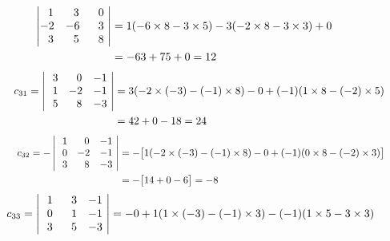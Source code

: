 \documentclass[12pt]{amsart}
\begin{document}
\begin{enumerate}
\begin{enumerate}
\begin{align}
\begin{vmatrix}
					\text{ } \text{ }1 &\text{ } \text{ }3 &\text{ } \text{ }0 \text{ } \\
					-2 &-6 &\text{ } \text{ }3 \text{ } \\
					\text{ } \text{ }3 &\text{ } \text{ }5 &\text{ } \text{ }8 \text{ } \\
				\end{vmatrix}&=1(-6\times8-3\times5)-3(-2\times8-3\times3)+0 \notag \\
				&=-63+75+0=12 \notag
			\end{align}
			\begin{align}
			\hspace{1cm} c_{31}=
				\begin{vmatrix}
					\text{ } \text{ }3 &\text{ } \text{ }0 &-1 \text{ } \\
					\text{ } \text{ }1 &-2 &-1 \text{ } \\
					\text{ } \text{ }5 &\text{ } \text{ }8 &-3 \text{ } \\
				\end{vmatrix}&=3(-2\times(-3)-(-1)\times8)-0+(-1)(1\times8-(-2)\times5) \notag \\
				&=42+0-18=24 \notag
			\end{align}
			\begin{align}
			\hspace{1.2cm} c_{32}=-
				\begin{vmatrix}
					\text{ } \text{ }1 &\text{ } \text{ }0 &-1 \text{ } \\
					\text{ } \text{ }0 &-2 &-1 \text{ } \\
					\text{ } \text{ }3 &\text{ } \text{ }8 &-3 \text{ } \\
				\end{vmatrix}&=-\big[1(-2\times(-3)-(-1)\times8)-0+(-1)(0\times8-(-2)\times3)\big] \notag \\
				&=-\big[14+0-6\big]=-8 \notag
			\end{align}
			\begin{align}
			\hspace{0.4cm} c_{33}=
				\begin{vmatrix}
					\text{ } \text{ }1 &\text{ } \text{ }3 &-1 \text{ } \\
					\text{ } \text{ }0 &\text{ } \text{ }1 &-1 \text{ } \\
					\text{ } \text{ }3 &\text{ } \text{ }5 &-3 \text{ } \\
				\end{vmatrix}&=-0+1(1\times(-3)-(-1)\times3)-(-1)(1\times5-3\times3) \notag \\

\end{align}
\end{enumerate}
\end{enumerate}
\end{document}

